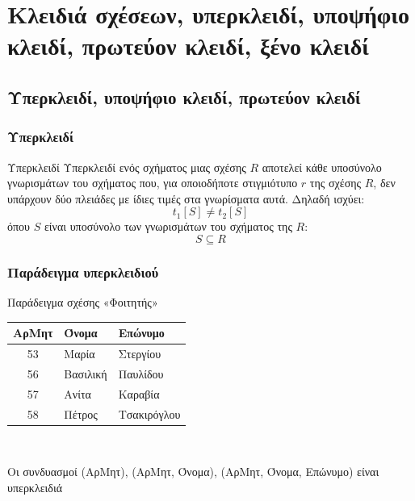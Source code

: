 
\section[\textgreek{Κλειδιά}] {\textgreek {Κλειδιά σχέσεων, υπερκλειδί, υποψήφιο κλειδί, πρωτεύον κλειδί, ξένο κλειδί} }

\subsection[\textgreek{Υπερκλειδί, υποψήφιο κλειδί, πρωτεύον κλειδί}] {\textgreek {Υπερκλειδί, υποψήφιο κλειδί, πρωτεύον κλειδί} }

\begin{frame}[t, fragile]
\frametitle{Υπερκλειδί}
\begin{minipage}{0.94\textwidth}
  \large
  \begin{block}{Υπερκλειδί}
    {\bb Υπερκλειδί} ενός σχήματος μιας σχέσης $R$ αποτελεί κάθε υποσύνολο 
    γνωρισμάτων του σχήματος που, για οποιοδήποτε στιγμιότυπο $r$ της σχέσης $R$, 
    δεν υπάρχουν δύο πλειάδες με ίδιες τιμές
    στα γνωρίσματα αυτά. Δηλαδή ισχύει: \[ t_1[S] \neq t_2[S] \]
    όπου $S$ είναι υποσύνολο των γνωρισμάτων του σχήματος της $R$:
    \[ S \subseteq R \]  
  \end{block}
\end{minipage}
\end{frame}


\begin{frame}[t, fragile]
\frametitle{Παράδειγμα υπερκλειδιού}
\begin{minipage}{0.94\textwidth}
  \large
  \begin{exampleblock}{Παράδειγμα σχέσης «Φοιτητής»}
        \begin{tabular}{ c l l } \hline
        {\bf ΑρΜητ}      & {\bf Όνομα} & {\bf Επώνυμο} \\ \hline
        53  &  Μαρία     & Στεργίου  \\
        56  &  Βασιλική  & Παυλίδου  \\
        57  &  Ανίτα     & Καραβία  \\
        58  &  Πέτρος    & Τσακιρόγλου  \\ \hline
      \end{tabular} \\
      \par \bigskip
       Οι συνδυασμοί (ΑρΜητ), (ΑρΜητ, Όνομα), (ΑρΜητ, Όνομα, Επώνυμο) είναι {\cee υπερκλειδιά}
  \end{exampleblock}
\end{minipage}
\end{frame}


